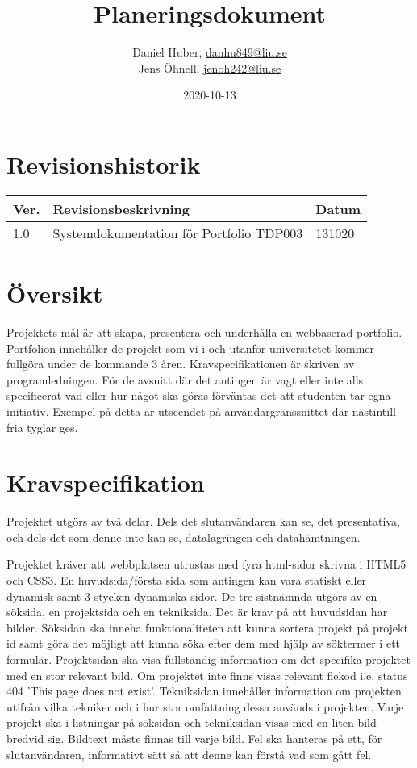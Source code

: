\documentclass{TDP003mall}
\author{Daniel Huber, \url{danhu849@liu.se}\\
  Jens Öhnell, \url{jenoh242@liu.se}}
\title{Planeringsdokument}
\date{2020-10-13}
\begin{document}
\projectpage
\section{Revisionshistorik}
\begin{table}[!h]
\begin{tabularx}{\linewidth}{|l|X|l|}
\hline
Ver. & Revisionsbeskrivning & Datum \\\hline
1.0 & Systemdokumentation för Portfolio TDP003 & 131020 \\\hline
\end{tabularx}
\end{table}


\section{Översikt}
Projektets mål är att skapa, presentera och underhålla en webbaserad portfolio. Portfolion innehåller de projekt som vi i och utanför universitetet kommer fullgöra under de kommande 3 åren. Kravspecifikationen är skriven av programledningen. För de avsnitt där det antingen är vagt eller inte alls specificerat vad eller hur något ska göras förväntas det att studenten tar egna initiativ. Exempel på detta är utseendet på användargränssnittet där nästintill fria tyglar ges.


\section{Kravspecifikation}
Projektet utgörs av två delar. Dels det slutanvändaren kan se, det presentativa, och dels det som denne inte kan se, datalagringen och datahämtningen.

Projektet kräver att webbplatsen utrustas med fyra html-sidor skrivna i HTML5 och CSS3. En huvudsida/första sida som antingen kan vara statiskt eller dynamisk samt 3 stycken dynamiska sidor. De tre sistnämnda utgörs av en söksida, en projektsida och en tekniksida. Det är krav på att huvudsidan har bilder. Söksidan ska inneha funktionaliteten att kunna sortera projekt på projekt id samt göra det möjligt att kunna söka efter dem med hjälp av söktermer i ett formulär. Projektsidan ska visa fullständig information om det specifika projektet med en stor relevant bild. Om projektet inte finns visas relevant flekod i.e. status 404 'This page does not exist'. Tekniksidan innehåller information om projekten utifrån vilka tekniker och i hur stor omfattning dessa används i projekten. Varje projekt ska i listningar på söksidan och tekniksidan visas med en liten bild bredvid sig. Bildtext måste finnas till varje bild. Fel ska hanteras på ett, för slutanvändaren, informativt sätt så att denne kan förstå vad som gått fel.
\end{document}
